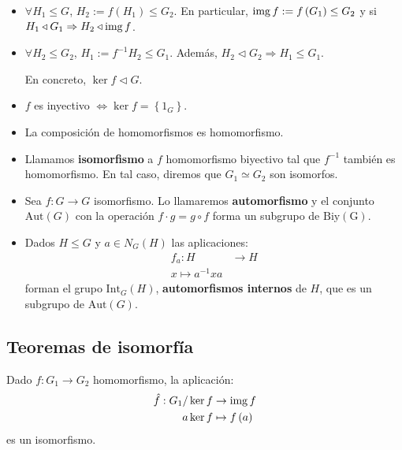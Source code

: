 \begin{obs}
\begin{itemize}
    \item $\forall H_1 \le G$, $H_2 := f\left( H_1 \right) \le G_2$. En particular, $\operatorname{img} f := f\left( G_1 \right) \le G_2$ y si $H_1 \triangleleft G_1 \Rightarrow H_2 \triangleleft \operatorname{img} f$.
    \item $\forall H_2 \le G_2$, $H_1 := f^{-1} H_2 \le G_1$. Además, $H_2 \triangleleft G_2 \Rightarrow H_1 \le G_1$.

    En concreto, $\ker f \triangleleft G$.

    \item $f$ es inyectivo $\Leftrightarrow \ker f = \left\{ 1_G \right\}$.

    \item La composición de homomorfismos es homomorfismo.
        
    \item Llamamos \textbf{isomorfismo} a $f$ homomorfismo biyectivo tal que $f^{-1}$ también es homomorfismo. En tal caso, diremos que $G_1 \simeq G_2$ son isomorfos.
\end{itemize}
\end{obs}

\begin{ej}
\begin{itemize}
    \item Sea $f: G \rightarrow G$ isomorfismo. Lo llamaremos \textbf{automorfismo} y el conjunto $\mathrm{Aut}\left( G \right)$ con la operación $f \cdot g = g \circ f$ forma un subgrupo de $\mathrm{Biy\left( G \right)}$.

    \item Dados $H \le G$ y $a \in N_G\left( H \right)$ las aplicaciones:
    \begin{align*}
        f_a : H &\rightarrow H\\
        x \mapsto a^{-1} x a
    \end{align*}
    forman el grupo $\mathrm{Int}_G\left( H \right)$, \textbf{automorfismos internos} de $H$, que es un subgrupo de $\mathrm{Aut}\left( G \right)$.
\end{itemize}
\end{ej}

\subsection{Teoremas de isomorfía}
\begin{theo}
Dado $f: G_1 \rightarrow G_2$ homomorfismo, la aplicación:
\begin{align*}
    \hat{f}: G_1 / \ker f &\rightarrow \operatorname{img} f\\
    a \ker f &\mapsto f\left( a \right)
\end{align*}
es un isomorfismo.
\end{theo}

